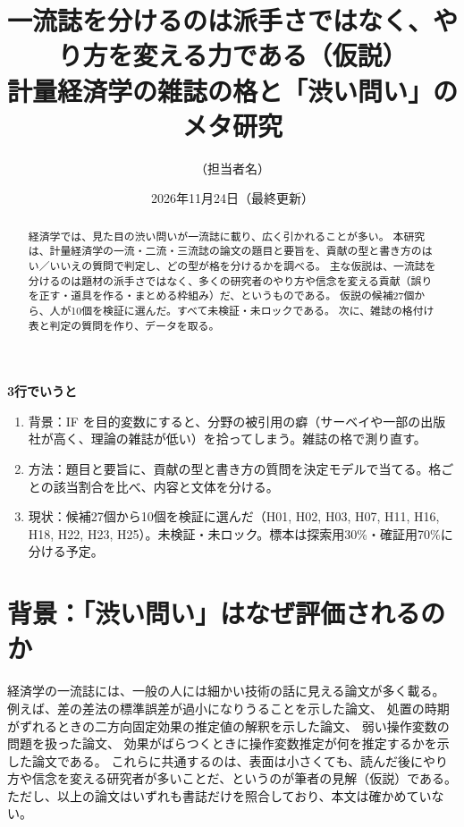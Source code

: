 \documentclass[a4paper,10pt]{ltjsarticle}
\title{一流誌を分けるのは派手さではなく、やり方を変える力である（仮説）\\計量経済学の雑誌の格と「渋い問い」のメタ研究}
\author{（担当者名）}
\date{2026年11月24日（最終更新）}
\begin{document}
\maketitle

\begin{abstract}
経済学では、見た目の渋い問いが一流誌に載り、広く引かれることが多い。
本研究は、計量経済学の一流・二流・三流誌の論文の題目と要旨を、貢献の型と書き方のはい／いいえの質問で判定し、どの型が格を分けるかを調べる。
主な仮説は、一流誌を分けるのは題材の派手さではなく、多くの研究者のやり方や信念を変える貢献（誤りを正す・道具を作る・まとめる枠組み）だ、というものである。
仮説の候補27個から、人が10個を検証に選んだ。すべて未検証・未ロックである。
次に、雑誌の格付け表と判定の質問を作り、データを取る。
\end{abstract}

\begin{chaptermap}
\textbf{3行でいうと}
\begin{enumerate}[leftmargin=*]
  \item 背景：IF を目的変数にすると、分野の被引用の癖（サーベイや一部の出版社が高く、理論の雑誌が低い）を拾ってしまう。雑誌の格で測り直す。
  \item 方法：題目と要旨に、貢献の型と書き方の質問を決定モデルで当てる。格ごとの該当割合を比べ、内容と文体を分ける。
  \item 現状：候補27個から10個を検証に選んだ（H01, H02, H03, H07, H11, H16, H18, H22, H23, H25）。未検証・未ロック。標本は探索用30\%・確証用70\%に分ける予定。
\end{enumerate}
\end{chaptermap}

\section{背景：「渋い問い」はなぜ評価されるのか}\label{sec:bg}
経済学の一流誌には、一般の人には細かい技術の話に見える論文が多く載る。
例えば、差の差法の標準誤差が過小になりうることを示した論文\parencite{bertrand2004}、
処置の時期がずれるときの二方向固定効果の推定値の解釈を示した論文\parencite{goodmanbacon2021,dechaisemartin2020,callaway2021}、
弱い操作変数の問題を扱った論文\parencite{staiger1997}、
効果がばらつくときに操作変数推定が何を推定するかを示した論文\parencite{imbens1994}である。
これらに共通するのは、表面は小さくても、読んだ後にやり方や信念を変える研究者が多いことだ、というのが筆者の見解（仮説）である。
ただし、以上の論文はいずれも書誌だけを照合しており、本文は確かめていない。
\end{document}
